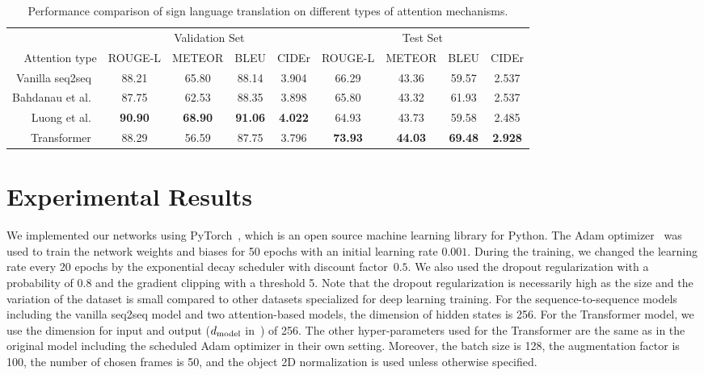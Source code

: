 \documentclass[10pt,twocolumn,letterpaper]{article}
\begin{document}
\begin{table*}
\centering
\begin{tabular}{@{ }rcccccccc@{ }}
\toprule
& \multicolumn{4}{c}{Validation Set} & \multicolumn{4}{c}{Test Set} \\
\cmidrule(lr){2-5} \cmidrule(lr){6-9}
Attention type    &   ROUGE-L & METEOR  & BLEU  & CIDEr &  ROUGE-L & METEOR  & BLEU & CIDEr\\
\midrule
Vanilla seq2seq~\cite{SutskeverVL14} & 88.21 & 65.80 & 88.14 & 3.904 & 66.29 & 43.36 & 59.57 & 2.537\\
Bahdanau et al.~\cite{BahdanauCB14} & 87.75 & 62.53 & 88.35 & 3.898 & 65.80 & 43.32 & 61.93 & 2.537\\
Luong et al.~\cite{LuongPM15} & \textbf{90.90} & \textbf{68.90} & \textbf{91.06} & \textbf{4.022} & 64.93 & 43.73 & 59.58 & 2.485 \\
Transformer~\cite{VaswaniSPUJGKP17} & 88.29 & 56.59 & 87.75 & 3.796 & \textbf{73.93} & \textbf{44.03} & \textbf{69.48} & \textbf{2.928} \\ 
\bottomrule
\end{tabular}
\caption{Performance comparison of sign language translation on different types of attention mechanisms.}
\label{tab:attention}
\end{table*}

\section{Experimental Results}

We implemented our networks using PyTorch~\cite{PaszkeGCCYDLDAL17}, which is an open source machine learning library for Python.
The Adam optimizer~\cite{KingmaB14} was used to train the network weights and biases for 50 epochs with an initial learning rate $0.001$. During the training, we changed the learning rate every 20 epochs by the exponential decay scheduler with discount factor~$0.5$. We also used the dropout regularization with a probability of 0.8 and the gradient clipping with a threshold 5. Note that the dropout regularization is necessarily high as the size and the variation of the dataset is small compared to other datasets specialized for deep learning training. For the sequence-to-sequence models including the vanilla seq2seq model and two attention-based models, the dimension of hidden states is 256. For the Transformer model, we use the dimension for input and output ($d_{\rm model}$ in~\cite{VaswaniSPUJGKP17}) of 256. The other hyper-parameters used for the Transformer are the same as in the original model including the scheduled Adam optimizer in their own setting. Moreover, the batch size is 128, the augmentation factor is 100, the number of chosen frames is 50, and the object 2D normalization is used unless otherwise specified.
\end{document}
